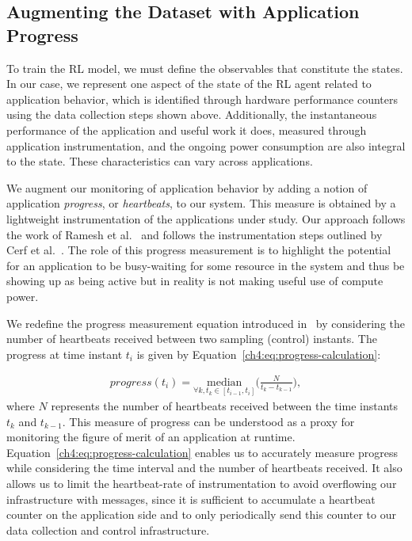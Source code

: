 \subsection{Augmenting the Dataset with Application Progress} \label{ch4:subsec:Performance_Measurement}
To train the RL model, we must define the observables that constitute the states. In our case, we represent one aspect of the state of the RL agent related to application behavior, which is identified through hardware performance counters using the data collection steps shown above. Additionally, the instantaneous performance of the application and useful work it does, measured through application instrumentation, and the ongoing power consumption are also integral to the state. These characteristics can vary across applications.

We augment our monitoring of application behavior by adding a notion of application \textit{progress}, or \textit{heartbeats}, to our system. This measure is obtained by a lightweight instrumentation of the applications under study.  Our approach follows the work of Ramesh et al.~\cite{ramesh2019understanding} and follows the instrumentation steps outlined by Cerf et al.~\cite{cerf2021sustaining}.
The role of this progress measurement is to highlight the potential for an application to be busy-waiting for some resource in the system and thus be showing up as being active but in reality is not making useful use of compute power.

We redefine the progress measurement equation introduced in~\cite{ramesh2019understanding} by considering the number of heartbeats received between two sampling (control) instants. The progress at time instant $t_i$ is given by Equation~\eqref{ch4:eq:progress-calculation}:

\begin{equation}
\begin{aligned}
progress(t_i) = \underset{\forall k,t_k \in [t_{i-1},t_i]}{\text{median}}\bigg(\frac{N}{t_k-t_{k-1}} \bigg),
\end{aligned}
\label{ch4:eq:progress-calculation}
\end{equation}
where $N$ represents the number of heartbeats received between the time instants
$t_k$ and $t_{k-1}$. This measure of
progress can be understood as a proxy for monitoring the figure of merit
of an application at runtime. Equation~\eqref{ch4:eq:progress-calculation} enables us to accurately measure progress while considering the time interval and the number of heartbeats received. It also allows us to limit the heartbeat-rate of instrumentation to avoid overflowing our infrastructure with messages, since  it is sufficient to accumulate a 
heartbeat counter on the application side and to only periodically send this
counter to our data collection and control infrastructure. 

